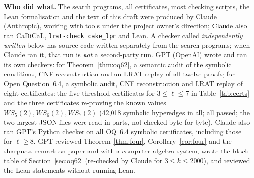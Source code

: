 \documentclass[11pt]{amsart}
\theoremstyle{definition}
\begin{document}
\smallskip\noindent\textbf{Who did what.} The search programs, all certificates, most checking scripts, the Lean formalisation and the text of this draft were produced by Claude (Anthropic), working with tools under the project owner's direction; Claude also ran CaDiCaL, \texttt{lrat-check}, \texttt{cake\_lpr} and Lean. A checker called \emph{independently written} below has source code written separately from the search programs; when Claude ran it, that run is \emph{not} a second-party run.
GPT (OpenAI) wrote and ran its own checkers: for Theorem~\ref{thm:oq62}, a semantic audit of the symbolic conditions, CNF reconstruction and an LRAT replay of all twelve proofs; for Open Question~6.4, a symbolic audit, CNF reconstruction and LRAT replay of eight certificates: the five threshold certificates for $3\le\ell\le7$ in Table~\ref{tab:certs} and the three certificates re-proving the known values $WS_5(2),WS_6(2),WS_7(2)$ (42{,}018 symbolic hyperedges in all; all passed; the two largest JSON files were read in parts, not checked byte for byte). Claude also ran GPT's Python checker on all OQ~6.4 symbolic certificates, including those for $\ell\ge8$. GPT reviewed Theorem~\ref{thm:four}, Corollary~\ref{cor:four} and the sharpness remark on paper and with a computer algebra system, wrote the block table of Section~\ref{sec:oq62} (re-checked by Claude for $3\le k\le2000$), and reviewed the Lean statements without running Lean.
\end{document}
